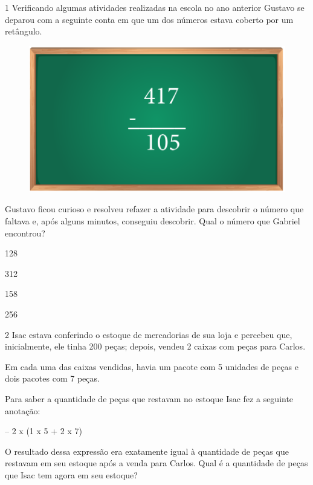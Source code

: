 \num{1} Verificando algumas atividades realizadas na escola no ano anterior
Gustavo se deparou com a seguinte conta em que um dos números estava
coberto por um retângulo.

\begin{figure}[htpb!]
\centering
\includegraphics[width=.5\textwidth]{../ilustracoes/MAT5/SAEB_5ANO_MAT_figura22.png}
\end{figure}

Gustavo ficou curioso e resolveu refazer a atividade para descobrir o
número que faltava e, após alguns minutos, conseguiu descobrir. Qual o número que Gabriel encontrou?\medskip

\begin{minipage}{.5\textwidth}
\begin{escolha}
\item
  128
\item
  312
\item
  158
\item
  256
\end{escolha}
\end{minipage}

\num{2} Isac estava conferindo o estoque de mercadorias de sua loja e
percebeu que, inicialmente, ele tinha 200 peças; depois, vendeu 2 caixas com peças para Carlos.

Em cada uma das caixas vendidas, havia um pacote com 5 unidades de peças e dois
pacotes com 7 peças.

Para saber a quantidade de peças que restavam no estoque Isac fez a
seguinte anotação:

\begin{mdframed}[linewidth=2pt,linecolor=salmao,backgroundcolor=salmao!20]
 – 2 x (1 x 5 + 2 x 7)
\end{mdframed}

O resultado dessa expressão era exatamente igual à quantidade de peças
que restavam em seu estoque após a venda para Carlos. Qual é a
quantidade de peças que Isac tem agora em seu estoque?\medskip

